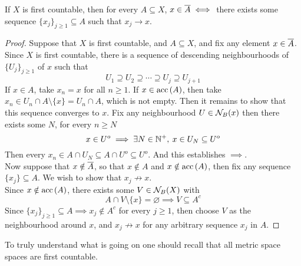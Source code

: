 \documentclass[../../main.tex]{subfiles}
\begin{document}
\begin{wts}
    If $X$ is first countable, then for every $A\subseteq X$, $x\in \overline{A}\iff$ there exists some sequence $\{x_j\}_{j\geq 1}\subseteq A$ such that $x_j\to x$.
\end{wts}
\begin{proof}
    Suppose that $X$ is first countable, and $A\subseteq X$, and fix any element $x\in\overline{A}$. Since $X$ is first countable, there is a sequence of descending neighbourhoods of $\{U_j\}_{j\geq 1}$ of $x$ such that
    \[
    U_1\supseteq U_2\supseteq \cdots\supseteq U_j\supseteq U_{j+1}
    \]
    If $x\in A$, take $x_n = x$ for all $n\geq 1$. If $x\in\operatorname{acc}{(A)}$, then take $x_n\in U_n\cap A\setminus \{x\}=U_n\cap A$, which is not empty. Then it remains to show that this sequence converges to $x$. Fix any neighbourhood $U\in\mathcal{N}_B({x})$ then there exists some $N$, for every $n\geq N$
    \[
    x\in U^o\implies \exists N\in\mathbb{N}^+, \: x\in U_N\subseteq U^o
    \]
    Then every $x_n\in A\cap U_N\subseteq A\cap U^o\subseteq U^o$. And this establishes $\implies$.\\
    
    Now suppose that $x\notin \overline{A}$, so that $x\notin A$ and $x\notin \operatorname{acc}{(A)}$, then fix any sequence $\{x_j\}\subseteq A$. We wish to show that $x_j\not\to x$.\\
    
    Since $x\notin \operatorname{acc}{(A)}$, there exists some $V\in\mathcal{N}_B({X})$ with
    \[
    A\cap V\setminus\{x\}=\varnothing\implies V\subseteq A^c
    \]
    Since $\{x_j\}_{j\geq 1}\subseteq A\implies x_j\notin A^c$ for every $j\geq 1$, then choose $V$ as the neighbourhood around $x$, and $x_j\not\to x$ for any arbitrary sequence $x_j$ in $A$.
\end{proof}
\remark To truly understand what is going on one should recall that all metric space spaces are first countable.
\end{document}
